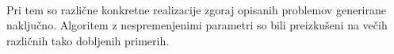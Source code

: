\documentclass[a4paper,12pt]{article} %
\begin{document}
\\
\vspace{2mm}

Pri tem so različne konkretne realizacije zgoraj opisanih problemov generirane naključno. Algoritem z nespremenjenimi parametri so bili preizkušeni na večih različnih tako dobljenih primerih.
\end{document}
